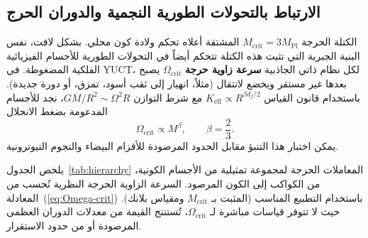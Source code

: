 \documentclass[12pt,a4paper]{article}
\newcommand{\Keff}{K_{\mathrm{eff}}}
\begin{document}
	\subsection{الارتباط بالتحولات الطورية النجمية والدوران الحرج}
	
	الكتلة الحرجة \(M_{\mathrm{crit}} = 3M_{\mathrm{Pl}}\) المشتقة أعلاه تحكم ولادة كون محلي. بشكل لافت، نفس البنية الجبرية التي تثبت هذه الكتلة تتحكم أيضاً في التحولات الطورية للأجسام الفيزيائية الفلكية المضغوطة. في YUCT، لكل نظام ذاتي الجاذبية \textbf{سرعة زاوية حرجة} \(\Omega_{\mathrm{crit}}\) يصبح بعدها غير مستقر ويخضع لانتقال (مثلاً، انهيار إلى ثقب أسود، تمزق، أو دورة جديدة). باستخدام قانون القياس \(\Keff \propto R^{\beta d_f/2}\) مع شرط التوازن \(GM/R^2 \sim \Omega^2 R\)، نجد للأجسام المدعومة بضغط الانحلال
	\begin{equation}
		\Omega_{\mathrm{crit}} \propto M^{\beta}, \qquad \beta = \frac{2}{3}.
		\label{eq:Omega-crit}
	\end{equation}
	يمكن اختبار هذا التنبؤ مقابل الحدود المرصودة للأقزام البيضاء والنجوم النيوترونية.
	
	يلخص الجدول~\ref{tab:hierarchy} المعاملات الحرجة لمجموعة تمثيلية من الأجسام الكونية، من الكواكب إلى الكون المرصود. السرعة الزاوية الحرجة النظرية تُحسب من المعادلة~(\ref{eq:Omega-crit}) باستخدام التطبيع المناسب (المثبت بـ \(M_{\mathrm{crit}}\) ومقياس بلانك). حيث لا تتوفر قياسات مباشرة لـ \(\Omega_{\mathrm{crit}}\)، تُستنتج القيمة من معدلات الدوران العظمى المرصودة أو من حدود الاستقرار.
	
\end{document}
